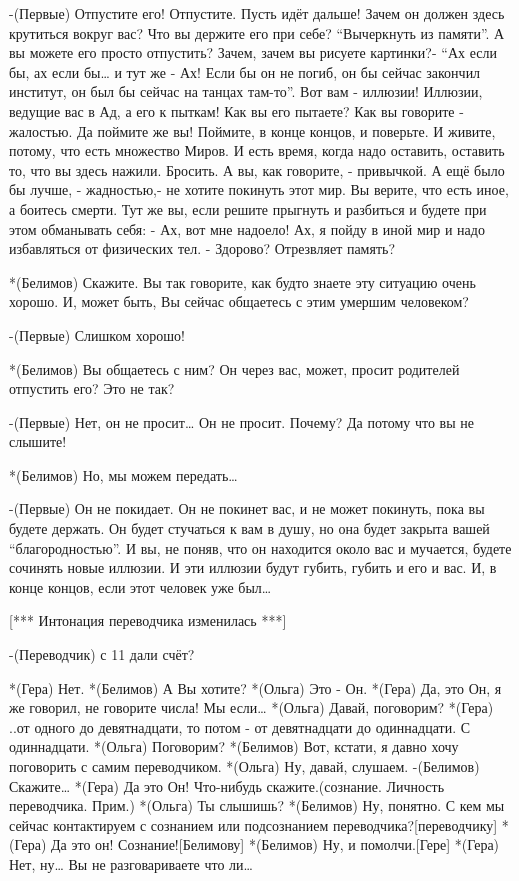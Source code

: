 -(Первые) Отпустите его! Отпустите. Пусть идёт дальше! Зачем он должен здесь крутиться вокруг вас? Что вы держите его при себе? “Вычеркнуть из памяти”.  А вы можете его просто отпустить? Зачем, зачем вы рисуете картинки?- “Ах если бы, ах если бы… и тут же -  Ах! Если бы он не погиб, он бы сейчас закончил институт, он был бы сейчас на танцах там-то”. Вот вам - иллюзии! Иллюзии, ведущие вас в Ад, а его к пыткам! Как вы его пытаете? Как вы говорите - жалостью. Да поймите же вы! Поймите, в конце концов,  и поверьте. И живите, потому,  что есть множество Миров. И есть время, когда надо оставить, оставить то, что вы здесь нажили. Бросить. А вы, как говорите, - привычкой. А ещё было бы лучше, -  жадностью,-  не хотите покинуть этот мир. Вы верите, что есть иное, а боитесь смерти. Тут же вы, если решите прыгнуть и разбиться и будете при этом обманывать себя: - Ах, вот мне надоело! Ах, я пойду в иной мир и надо избавляться от физических тел. - Здорово? Отрезвляет память?

*(Белимов) Скажите. Вы так говорите, как будто знаете эту ситуацию очень хорошо. И, может быть, Вы сейчас общаетесь с этим умершим человеком?

-(Первые) Слишком хорошо!

*(Белимов) Вы общаетесь с ним? Он через вас, может, просит родителей отпустить его? Это не так?

-(Первые) Нет, он не просит… Он не просит. Почему? Да потому что вы не слышите!

*(Белимов) Но, мы можем передать…

-(Первые) Он не покидает. Он не покинет вас, и не может покинуть, пока вы будете держать. Он будет стучаться к вам в душу, но она будет закрыта вашей “благородностью”. И вы, не поняв, что он находится около вас и мучается, будете сочинять новые иллюзии. И эти иллюзии будут губить, губить и его и вас. И, в конце концов, если этот человек уже был…

[*** Интонация переводчика изменилась ***]

-(Переводчик) с 11 дали счёт?

*(Гера) Нет.
*(Белимов) А Вы хотите?
*(Ольга) Это - Он.
*(Гера) Да, это Он, я же говорил, не говорите числа! Мы если…
*(Ольга) Давай, поговорим?
*(Гера) ..от одного до девятнадцати, то потом - от девятнадцати до одиннадцати. С одиннадцати.
*(Ольга) Поговорим?
*(Белимов) Вот, кстати, я давно хочу поговорить с самим переводчиком.
*(Ольга) Ну, давай, слушаем.
-(Белимов) Скажите…
*(Гера) Да это Он! Что-нибудь скажите.(сознание. Личность переводчика. Прим.)
*(Ольга) Ты слышишь?
*(Белимов) Ну, понятно. С кем мы сейчас контактируем с сознанием или подсознанием переводчика?[переводчику]
*(Гера) Да это он! Сознание![Белимову]
*(Белимов) Ну, и помолчи.[Гере]
*(Гера) Нет, ну… Вы не разговариваете что ли…

